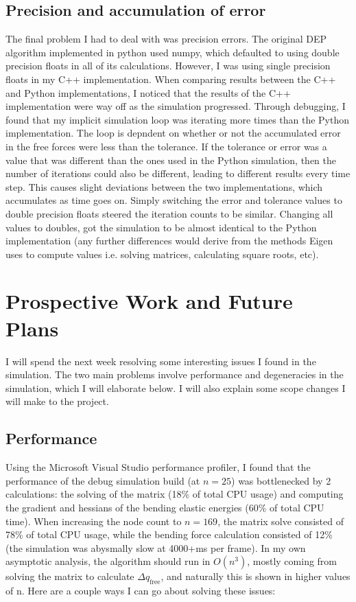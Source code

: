 \documentclass[letterpaper, 10 pt, conference]{ieeeconf}  %
\begin{document}
\subsection{Precision and accumulation of error}
        The final problem I had to deal with was precision errors. The original DEP algorithm implemented in python used numpy, which defaulted to using double precision floats in all of its calculations. However, I was using single precision floats in my C++ implementation. When comparing results between the C++ and Python implementations, I noticed that the results of the C++ implementation were way off as the simulation progressed. Through debugging, I found that my implicit simulation loop was iterating more times than the Python implementation. The loop is depndent on whether or not the accumulated error in the free forces were less than the tolerance. If the tolerance or error was a value that was different than the ones used in the Python simulation, then the number of iterations could also be different, leading to different results every time step. This causes slight deviations between the two implementations, which accumulates as time goes on. Simply switching the error and tolerance values to double precision floats steered the iteration counts to be similar. Changing all values to doubles, got the simulation to be almost identical to the Python implementation (any further differences would derive from the methods Eigen uses to compute values i.e. solving matrices, calculating square roots, etc).


\section{Prospective Work and Future Plans}
        I will spend the next week resolving some interesting issues I found in the simulation. The two main problems involve performance and degeneracies in the simulation, which I will elaborate below. I will also explain some scope changes I will make to the project.

        \subsection{Performance}

        Using the Microsoft Visual Studio performance profiler, I found that the performance of the debug simulation build (at $n = 25$) was bottlenecked by 2 calculations: the solving of the matrix (18\% of total CPU usage) and computing the gradient and hessians of the bending elastic energies (60\% of total CPU time). When increasing the node count to $ n = 169$, the matrix solve consisted of 78\% of total CPU usage, while the bending force calculation consisted of 12\% (the simulation was abysmally slow at 4000+ms per frame). In my own asymptotic analysis, the algorithm should run in $O(n^3)$, mostly coming from solving the matrix to calculate $\Delta q_{\text{free}}$, and naturally this is shown in higher values of n. Here are a couple ways I can go about solving these issues:
\end{document}
